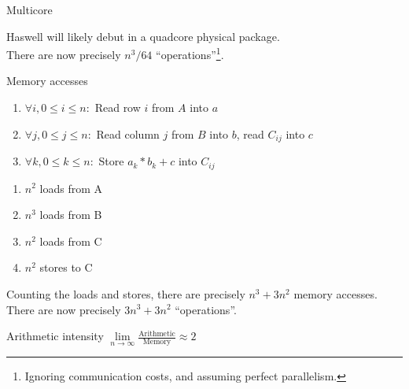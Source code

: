 \documentclass[mathserif,xcolor={dvipsnames,table}]{beamer}
\begin{document}
{
%
\begin{frame}[b]{Multicore}
\scriptsize{
\begin{block}{}
Haswell will likely debut in a quadcore physical package.\\
There are now precisely $n^{3}/64$ ``operations''\footnote{\tiny{Ignoring communication
costs, and assuming perfect parallelism.}}.
\end{block}
\vspace{.1in}
}
\end{frame}
}

\begin{frame}{Memory accesses}
\begin{enumerate}
\item $\forall i, 0\le i \le n:$ Read row $i$ from $A$ into $a$
\item $\forall j, 0\le j \le n:$ Read column $j$ from $B$ into $b$, read $C_{ij}$ into $c$
\item $\forall k, 0\le k \le n:$ Store $a_k * b_k + c$ into $C_{ij}$
\end{enumerate}
\vfill
\begin{enumerate}
\item $n^{2}$ loads from A
\item $n^{3}$ loads from B
\item $n^{2}$ loads from C
\item $n^{2}$ stores to C
\end{enumerate}
Counting the loads and stores, there are precisely $n^{3} + 3n^{2}$ memory
accesses. There are now precisely $3n^{3} + 3n^{2}$ ``operations''.
\vfill
\begin{alertblock}{Arithmetic intensity}
\center$\lim\limits_{n \to \infty} \frac{\text{Arithmetic}}{\text{Memory}}\approx 2$
\end{alertblock}
\vfill
\end{frame}
\end{document}
